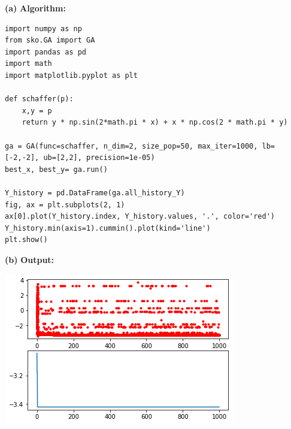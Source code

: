 \documentclass[11pt]{article}
\renewcommand\part[1]{\vspace{.10in}\textbf{(#1)}}
\newcommand\algorithm{\vspace{.10in}\textbf{Algorithm: }}
\newcommand\ot{\vspace{.10in}\textbf{Output: }}
\begin{document}
\part{a} \algorithm
\begin{lstlisting}
import numpy as np
from sko.GA import GA
import pandas as pd
import math 
import matplotlib.pyplot as plt

def schaffer(p):
    x,y = p
    return y * np.sin(2*math.pi * x) + x * np.cos(2 * math.pi * y)

ga = GA(func=schaffer, n_dim=2, size_pop=50, max_iter=1000, lb=[-2,-2], ub=[2,2], precision=1e-05)
best_x, best_y= ga.run()

Y_history = pd.DataFrame(ga.all_history_Y)
fig, ax = plt.subplots(2, 1)
ax[0].plot(Y_history.index, Y_history.values, '.', color='red')
Y_history.min(axis=1).cummin().plot(kind='line')
plt.show()
\end{lstlisting}

\part{b} \ot

\includegraphics{Fig2.png}
\end{document}
